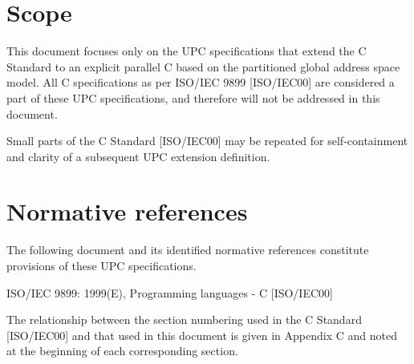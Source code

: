 \section{Scope}

\npf This document focuses only on the UPC specifications
    that extend the C Standard to an explicit parallel C based on the
    partitioned global address space model. All C specifications as per
    ISO/IEC 9899 [ISO/IEC00] are considered a part of these UPC
    specifications, and therefore will not be addressed in this
    document.

\np Small parts of the C Standard [ISO/IEC00] may be repeated for
    self-containment and clarity of a subsequent UPC extension
    definition.

\section{Normative references}

\npf The following document and its identified normative
     references constitute provisions of these UPC specifications.

\np ISO/IEC 9899: 1999(E), Programming languages - C
    [ISO/IEC00]

\np The relationship between the section numbering used in
    the C Standard [ISO/IEC00] and that used in this document is given
    in Appendix C and noted at the beginning of each corresponding section.

